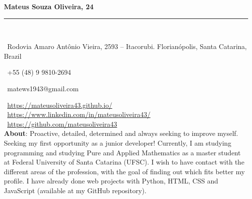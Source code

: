 \documentclass[a4paper,10pt]{article}
\makeatletter
\newcommand{\professional}{Mateus Souza Oliveira}
\newcommand{\age}{24}
\newcommand{\address}{Rodovia Amaro Antônio Vieira, 2593 -- Itacorubi. Florianópolis, Santa Catarina, Brazil}
\newcommand{\phone}{+55 (48) 9 9810-2694}
\newcommand{\email}{matews1943@gmail.com}
\newcommand{\about}{
    Proactive, detailed, determined and always seeking to improve myself. Seeking my first opportunity as a junior developer! Currently, I am studying programming and studying Pure and Applied Mathematics as a master student at Federal University of Santa Catarina (UFSC). I wish to have contact with the different areas of the profession, with the goal of finding out which fits better my profile. I have already done web projects with Python, HTML, CSS and JavaScript (available at my GitHub repository).
	\vspace{0\baselineskip}
}
\makeatother
\begin{document}
	\noindent
	\hfill
	\begin{minipage}{0.65\linewidth}
		\Huge{\bf \professional, \age}\\\vspace{-1.75\baselineskip}
		
		\noindent\rule{\textwidth}{1.5pt} {\ }\\\vspace{-1.8\baselineskip}
		
		\large{
		\faMapMarker \ \address \\
		\begin{minipage}{0.5\linewidth}
			\faWhatsapp \ \phone
		\end{minipage}
		\begin{minipage}{0.5\linewidth}
			\faEnvelope \ \email
		\end{minipage}
		\faLink \ \url{https://mateusoliveira43.github.io/}\\
		\faLinkedinSquare \ \url{https://www.linkedin.com/in/mateusoliveira43/}\\
		\faGithub \ \url{https://github.com/mateusoliveira43} \\
		\vfill
		\textbf{About}: \about
		}
	\end{minipage}
\end{document}
